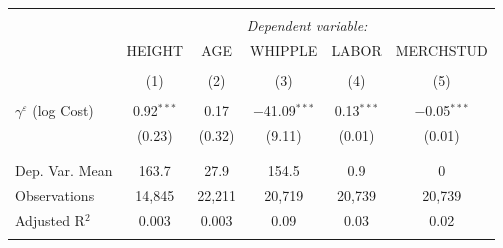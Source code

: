 
\begin{tabular}{@{\extracolsep{5pt}}lccccc} 
\\[-1.8ex]\hline 
\hline \\[-1.8ex] 
 & \multicolumn{5}{c}{\textit{Dependent variable:}} \\ 
\cline{2-6} 
 & HEIGHT & AGE & WHIPPLE & LABOR & MERCHSTUD \\ 
\\[-1.8ex] & (1) & (2) & (3) & (4) & (5)\\ 
\hline \\[-1.8ex] 
 $\gamma^{\varepsilon}$ (log Cost) & 0.92$^{***}$ & 0.17 & $-$41.09$^{***}$ & 0.13$^{***}$ & $-$0.05$^{***}$ \\ 
  & (0.23) & (0.32) & (9.11) & (0.01) & (0.01) \\ 
  & & & & & \\ 
\hline \\[-1.8ex] 
Dep. Var. Mean & 163.7 & 27.9 & 154.5 & 0.9 & 0 \\ 
Observations & 14,845 & 22,211 & 20,719 & 20,739 & 20,739 \\ 
Adjusted R$^{2}$ & 0.003 & 0.003 & 0.09 & 0.03 & 0.02 \\ 
\hline 
\hline \\[-1.8ex] 
\end{tabular} 
